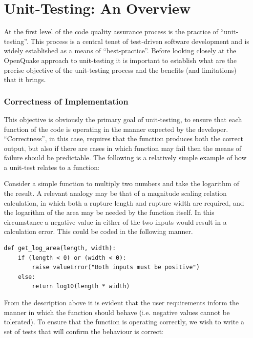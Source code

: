\section{Unit-Testing: An Overview}

At the first level of the code quality assurance process is the practice of ``unit-testing''. This process is a central tenet of test-driven software development and is widely established as a means of ``best-practice''. Before looking closely at the OpenQuake approach to unit-testing it is important to establish what are the precise objective of the unit-testing process and the benefits (and limitations) that it brings.

\subsubsection{Correctness of Implementation}

This objective is obviously the primary goal of unit-testing, to ensure that each function of the code is operating in the manner expected by the developer. ``Correctness'', in this case, requires that the function produces both the correct output, but also if there are cases in which function may fail then the means of failure should be predictable. The following is a relatively simple example of how a unit-test relates to a function:

Consider a simple function to multiply two numbers and take the logarithm of the result. A relevant analogy may be that of a magnitude scaling relation calculation, in which both a rupture length and rupture width are required, and the logarithm of the area may be needed by the function itself. In this circumstance a negative value in either of the two inputs would result in a calculation error. This could be coded in the following manner. 

\begin{lstlisting}[frame=single]
def get_log_area(length, width):
    if (length < 0) or (width < 0):
        raise valueError("Both inputs must be positive")
    else:
        return log10(length * width)
\end{lstlisting}

From the description above it is evident that the user requirements inform the manner in which the function should behave (i.e. negative values cannot be tolerated). To ensure that the function is operating correctly, we wish to write a set of tests that will confirm the behaviour is correct:

